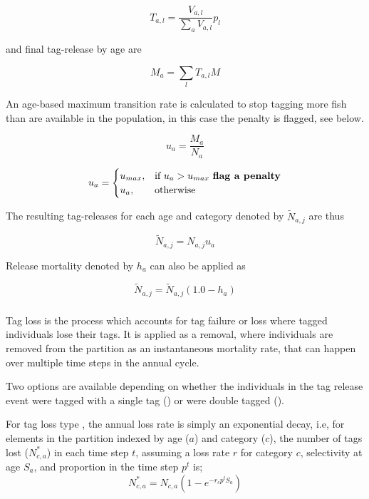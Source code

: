 $$ T_{a,l}= \frac{V_{a,l}}{\sum_a V_{a,l}} {p}_l$$

and final tag-release by age are

$$ M_{a} = \sum_l T_{a,l}M  $$

An age-based maximum transition rate is calculated to stop tagging more fish than are available in the population, in this case the penalty is flagged, see below.

$$ u_{a} = \frac{ M_{a} }{ N_{a}}  $$

$$
u_{a} =
\begin{cases}
u_{max},& \text{if } u_{a} > u_{max} \text{ \textbf{flag a penalty}}\\
u_{a},  & \text{otherwise}
\end{cases}
$$

The resulting tag-releases for each age and category denoted by \(\widetilde{N}_{a,j}\) are thus

$$
\widetilde{N}_{a,j} = N_{a,j} u_{a}
$$

Release mortality denoted by \(h_a\) can also be applied as

$$\widetilde{N}_{a,j} = \widetilde{N}_{a,j}\left(1.0 - h_a\right)$$

\subsubsection{}\label{sec:Process-TagLoss} 

Tag loss is the process which accounts for tag failure or loss where tagged individuals lose their tags. It is applied as a removal, where individuals are removed from the partition as an instantaneous mortality rate, that can happen over multiple time steps in the annual cycle. 

Two options are available depending on whether the individuals in the tag release event were tagged with a single tag () or were double tagged ().

For tag loss type , the annual loss rate is simply an exponential decay, i.e, for elements in the partition indexed by age ($a$) and category ($c$), the number of tags lost ($N^*_{c,a}$) in each time step $t$, assuming a loss rate $r$ for category $c$, selectivity at age $S_a$, and proportion in the time step $p^t$ is; 
\begin{equation}
	N^*_{c,a} = N_{c,a} (1 -e^{-r_c p^t S_a})
\end{equation}

